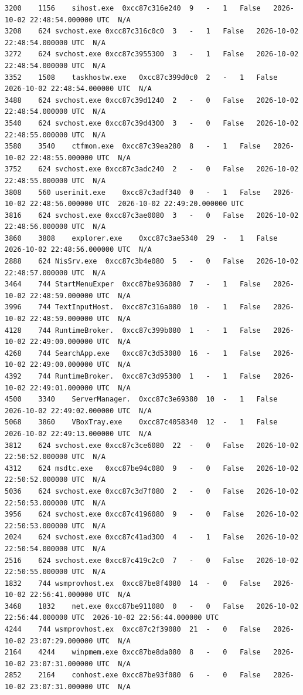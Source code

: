 \documentclass[11pt,letterpaper]{article}
\begin{document}
\begin{lstlisting}
3200	1156	sihost.exe	0xcc87c316e240	9	-	1	False	2026-10-02 22:48:54.000000 UTC	N/A
3208	624	svchost.exe	0xcc87c316c0c0	3	-	1	False	2026-10-02 22:48:54.000000 UTC	N/A
3272	624	svchost.exe	0xcc87c3955300	3	-	1	False	2026-10-02 22:48:54.000000 UTC	N/A
3352	1508	taskhostw.exe	0xcc87c399d0c0	2	-	1	False	2026-10-02 22:48:54.000000 UTC	N/A
3488	624	svchost.exe	0xcc87c39d1240	2	-	0	False	2026-10-02 22:48:54.000000 UTC	N/A
3540	624	svchost.exe	0xcc87c39d4300	3	-	0	False	2026-10-02 22:48:55.000000 UTC	N/A
3580	3540	ctfmon.exe	0xcc87c39ea280	8	-	1	False	2026-10-02 22:48:55.000000 UTC	N/A
3752	624	svchost.exe	0xcc87c3adc240	2	-	0	False	2026-10-02 22:48:55.000000 UTC	N/A
3808	560	userinit.exe	0xcc87c3adf340	0	-	1	False	2026-10-02 22:48:56.000000 UTC	2026-10-02 22:49:20.000000 UTC
3816	624	svchost.exe	0xcc87c3ae0080	3	-	0	False	2026-10-02 22:48:56.000000 UTC	N/A
3860	3808	explorer.exe	0xcc87c3ae5340	29	-	1	False	2026-10-02 22:48:56.000000 UTC	N/A
2888	624	NisSrv.exe	0xcc87c3b4e080	5	-	0	False	2026-10-02 22:48:57.000000 UTC	N/A
3464	744	StartMenuExper	0xcc87be936080	7	-	1	False	2026-10-02 22:48:59.000000 UTC	N/A
3996	744	TextInputHost.	0xcc87c316a080	10	-	1	False	2026-10-02 22:48:59.000000 UTC	N/A
4128	744	RuntimeBroker.	0xcc87c399b080	1	-	1	False	2026-10-02 22:49:00.000000 UTC	N/A
4268	744	SearchApp.exe	0xcc87c3d53080	16	-	1	False	2026-10-02 22:49:00.000000 UTC	N/A
4392	744	RuntimeBroker.	0xcc87c3d95300	1	-	1	False	2026-10-02 22:49:01.000000 UTC	N/A
4500	3340	ServerManager.	0xcc87c3e69380	10	-	1	False	2026-10-02 22:49:02.000000 UTC	N/A
5068	3860	VBoxTray.exe	0xcc87c4058340	12	-	1	False	2026-10-02 22:49:13.000000 UTC	N/A
3812	624	svchost.exe	0xcc87c3ce6080	22	-	0	False	2026-10-02 22:50:52.000000 UTC	N/A
4312	624	msdtc.exe	0xcc87be94c080	9	-	0	False	2026-10-02 22:50:52.000000 UTC	N/A
5036	624	svchost.exe	0xcc87c3d7f080	2	-	0	False	2026-10-02 22:50:53.000000 UTC	N/A
3956	624	svchost.exe	0xcc87c4196080	9	-	0	False	2026-10-02 22:50:53.000000 UTC	N/A
2024	624	svchost.exe	0xcc87c41ad300	4	-	1	False	2026-10-02 22:50:54.000000 UTC	N/A
2516	624	svchost.exe	0xcc87c419c2c0	7	-	0	False	2026-10-02 22:50:55.000000 UTC	N/A
1832	744	wsmprovhost.ex	0xcc87be8f4080	14	-	0	False	2026-10-02 22:56:41.000000 UTC	N/A
3468	1832	net.exe	0xcc87be911080	0	-	0	False	2026-10-02 22:56:44.000000 UTC	2026-10-02 22:56:44.000000 UTC
4244	744	wsmprovhost.ex	0xcc87c2f39080	21	-	0	False	2026-10-02 23:07:29.000000 UTC	N/A
2164	4244	winpmem.exe	0xcc87be8da080	8	-	0	False	2026-10-02 23:07:31.000000 UTC	N/A
2852	2164	conhost.exe	0xcc87be93f080	6	-	0	False	2026-10-02 23:07:31.000000 UTC	N/A


\end{lstlisting}
\end{document}
